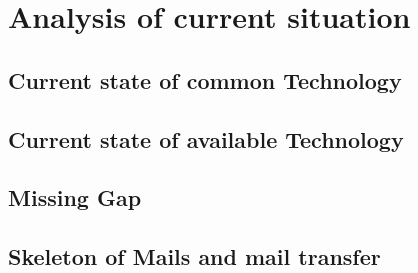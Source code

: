\chapter{Analysis of current situation\label{chap:analysis}}
\section{Current state of common Technology}
\section{Current state of available Technology}
\section{Missing Gap}
\section{Skeleton of Mails and mail transfer}


